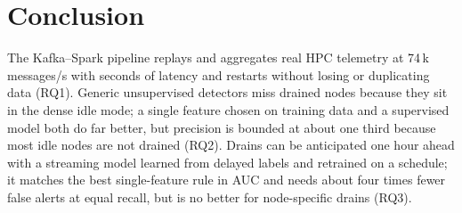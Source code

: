 \section{Conclusion}
\label{sec:conclusion}
The Kafka--Spark pipeline replays and aggregates real HPC telemetry at 74\,k messages/s with seconds of latency and restarts without losing or duplicating data (RQ1). Generic unsupervised detectors miss drained nodes because they sit in the dense idle mode; a single feature chosen on training data and a supervised model both do far better, but precision is bounded at about one third because most idle nodes are not drained (RQ2). Drains can be anticipated one hour ahead with a streaming model learned from delayed labels and retrained on a schedule; it matches the best single-feature rule in AUC and needs about four times fewer false alerts at equal recall, but is no better for node-specific drains (RQ3).
